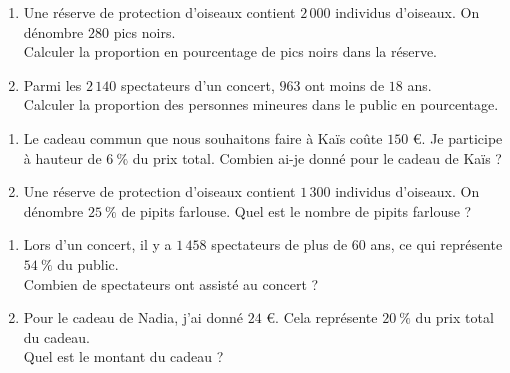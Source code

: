 {%
\begin{Exercice}
\leavevmode\vspace{-\baselineskip}
\begin{enumerate}
	\item Une réserve de protection d'oiseaux contient $2\,000$ individus d'oiseaux. On dénombre $280$ pics noirs. \\Calculer la proportion en pourcentage de pics noirs dans la réserve.
	\item Parmi les $2\,140$ spectateurs d'un concert, $963$ ont moins de $18$ ans. \\Calculer la proportion des personnes mineures dans le public en pourcentage.
\end{enumerate}
\end{Exercice}

\begin{Exercice}
\leavevmode\vspace{-\baselineskip}
\begin{enumerate}
	\item Le cadeau commun que nous souhaitons faire à Kaïs coûte $150$ €. Je participe à hauteur de $6~\%$ du prix total. Combien ai-je donné pour le cadeau de Kaïs ?
	\item Une réserve de protection d'oiseaux contient $1\,300$ individus d'oiseaux. On dénombre $25~\%$ de pipits farlouse. Quel est le nombre de pipits farlouse ?
\end{enumerate}
\end{Exercice}

\begin{Exercice}
\leavevmode\vspace{-\baselineskip}
\begin{enumerate}
	\item Lors d'un concert, il y a $1\,458$ spectateurs de plus de $60$ ans, ce qui représente $54~\%$ du public. \\Combien de spectateurs ont assisté au concert ?
	\item Pour le cadeau de Nadia, j'ai donné $24$ €. Cela représente $20~\%$ du prix total du cadeau. \\Quel est le montant du cadeau ?
\end{enumerate}
\end{Exercice}

}
